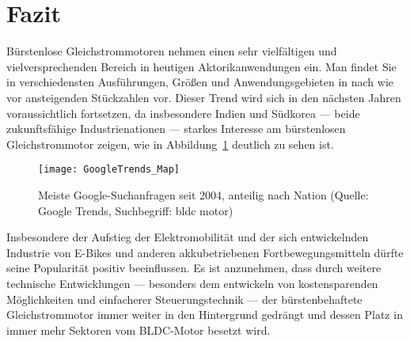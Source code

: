 \section{Fazit}

Bürstenlose Gleichstrommotoren nehmen einen sehr vielfältigen und vielversprechenden Bereich in heutigen Aktorikanwendungen ein. Man findet Sie in verschiedensten Ausführungen, Größen und Anwendungsgebieten in nach wie vor ansteigenden Stückzahlen vor. Dieser Trend wird sich in den nächsten Jahren voraussichtlich fortsetzen, da insbesondere Indien und Südkorea --- beide zukunftsfähige Industrienationen --- starkes Interesse am bürstenlosen Gleichstrommotor zeigen, wie in Abbildung~\ref{fig:Karte} deutlich zu sehen ist.

\begin{figure}[h]
  \centering
  \texttt{[image: GoogleTrends\_Map]}
  \caption[Meiste Google-Suchanfragen seit 2004, anteilig nach Nation]{Meiste Google-Suchanfragen seit 2004, anteilig nach Nation (Quelle: Google Trends, Suchbegriff: \glqq{}bldc motor\grqq{})}
  \label{fig:Karte}
\end{figure}

Insbesondere der Aufstieg der Elektromobilität und der sich entwickelnden Industrie von E-Bikes und anderen akkubetriebenen Fortbewegungsmitteln dürfte seine Popularität positiv beeinflussen. Es ist anzunehmen, dass durch weitere technische Entwicklungen --- besonders dem entwickeln von kostensparenden Möglichkeiten und einfacherer Steuerungstechnik --- der bürstenbehaftete Gleichstrommotor immer weiter in den Hintergrund gedrängt und dessen Platz in immer mehr Sektoren vom BLDC-Motor besetzt wird.

